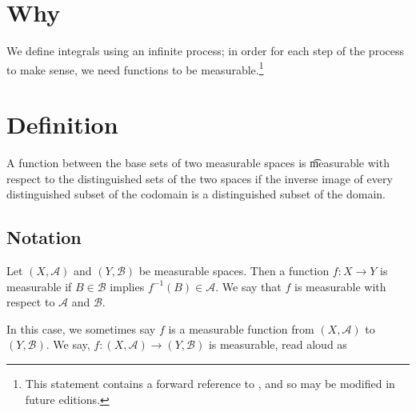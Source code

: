 

\section*{Why}

We define integrals using an infinite process; in order for each step of the process to make sense, we need functions to be measurable.\footnote{This statement contains a forward reference to , and so may be modified in future editions.}

\section*{Definition}

A function between the base sets of two measurable spaces is
\t{measurable}
with respect to the distinguished
sets of the two spaces if the
inverse image of every
distinguished subset of the
codomain is a distinguished
subset of the domain.

\subsection*{Notation}

Let $(X, \mathcal{A} )$
and $(Y, \mathcal{B} )$
be measurable spaces.
Then a function
$f: X \to Y$ is measurable
if $B \in \mathcal{B} $
implies $f^{-1}(B) \in \mathcal{A} $.
We say that $f$ is measurable
with respect to $\mathcal{A} $ and
$\mathcal{B} $.

In this case, we sometimes say
$f$ is a measurable function
from $(X, \mathcal{A} )$ to
$(Y, \mathcal{B} )$.
We say,
$f: (X, \mathcal{A} ) \to (Y, \mathcal{B} )$
is measurable, read aloud as

\blankpage